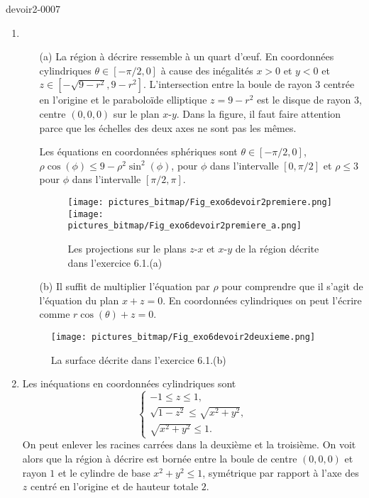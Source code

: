 \begin{corrige}{devoir2-0007}
  \begin{enumerate}
  \item 
    \begin{enumerate}
    \item[(a)] La région à décrire ressemble à un quart d'œuf. En coordonnées cylindriques $\theta\in [-\pi/2, 0]$ à cause des inégalités $x>0$ et $y<0$ et $z\in [-\sqrt{9-r^2}, 9-r^2]$. L'intersection entre la  boule de rayon $3$ centrée en l'origine et le paraboloïde elliptique $z=9-r^2$ est le disque de  rayon $3$, centre $(0,0,0)$ sur le plan $x$-$y$. Dans la figure, il faut faire attention parce que les échelles des deux axes ne sont pas les mêmes. 

      Les équations en coordonnées sphériques sont $\theta\in [-\pi/2, 0]$, $\rho\cos(\phi)\leq 9- \rho^2\sin^2(\phi)$, pour $\phi$ dans l'intervalle $[0, \pi/2]$ et $\rho\leq 3$ pour  $\phi$ dans l'intervalle $[\pi/2, \pi]$.
 \begin{figure}
  \begin{center}
    \texttt{[image: pictures\_bitmap/Fig\_exo6devoir2premiere.png]}
    \texttt{[image: pictures\_bitmap/Fig\_exo6devoir2premiere\_a.png]} 

  \caption{Les projections sur le plans $z$-$x$ et $x$-$y$ de la région décrite dans l'exercice 6.1.(a)}\label{exo6devoir2}
  \end{center}
 
  \end{figure}
    \item[(b)] Il suffit de multiplier l'équation par $\rho$ pour comprendre que il s'agit de l'équation du plan $x+z=0$. En coordonnées cylindriques on peut l'écrire comme $r\cos(\theta)+z=0$. 
    \end{enumerate}

\begin{figure}
  \begin{center}
     \texttt{[image: pictures\_bitmap/Fig\_exo6devoir2deuxieme.png]}

  \caption{La surface décrite dans l'exercice 6.1.(b)}\label{exo6devoir2un}
  \end{center}
 
  \end{figure}

  \item Les inéquations en coordonnées cylindriques sont 
    \begin{equation}
      \begin{cases}
        -1\leq z\leq 1,\\
        \sqrt{1-z^2}\leq\sqrt{x^2+y^2},\\
        \sqrt{x^2+y^2}\leq 1.
      \end{cases}
    \end{equation}
    On peut enlever les racines carrées dans la deuxième et la troisième. On voit alors que la région à décrire est bornée entre la boule de centre $(0,0,0)$ et rayon  $1$ et le cylindre de base $x^2+y^2\leq 1$, symétrique par rapport à l'axe des $z$ centré en l'origine et de hauteur totale $2$.  
  \end{enumerate}


\end{corrige}
